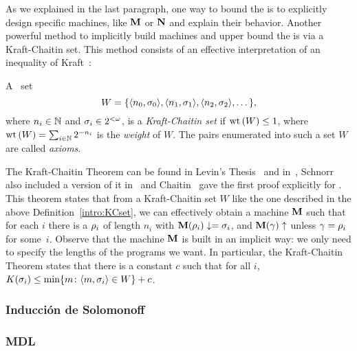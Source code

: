 As we explained in the last paragraph, one way to bound the
\kolcomp is to explicitly design specific machines, like ${\bf M}$ or
${\bf N}$ and explain their behavior. Another powerful method to
implicitly build \pfree machines and upper bound the \pfree
\kolcomp is via a Kraft-Chaitin set. This method consists of an
effective interpretation of an inequality of Kraft~\cite{K49}:

\begin{definicion}\label{intro:KCset}
 A \ce\ set
$$
W=\{\langle n_0 , \sigma_0 \rangle, \langle n_1 , \sigma_1 \rangle,
\langle n_2 , \sigma_2 \rangle,\dots\},
$$
where $n_i\in\mathbb{N}$ and $\sigma_i\in 2^{<\omega}$, is a {\em Kraft-Chaitin
set} if ${\rm wt}\left(W\right)\leq 1$, where ${\rm wt}\left(W\right)=
\sum_{i\in\mathbb{N}} 2^{-n_i}$ is the {\em weight} of $W$. The pairs
enumerated into such a set $W$ are called {\em axioms}.
\end{definicion}

The Kraft-Chaitin Theorem can be found in Levin's
Thesis~\cite{L71} and in~\cite{levin1974laws}, Schnorr also included a
version of it in~\cite{S73} and Chaitin~\cite{chaitin1975theory} gave the first
proof explicitly for \pfree \kolcomp. This theorem states that
from a Kraft-Chaitin set $W$ like the one described in the above
Definition~\ref{intro:KCset}, we can effectively obtain a \pfree
machine ${\bf M}$ such that for each $i$ there is a $\rho_i$ of length
$n_i$ with ${\bf M}(\rho_i)\downarrow=\sigma_i$, and ${\bf M}(\gamma)\uparrow$
unless $\gamma=\rho_i$ for some~$i$. Observe that the machine ${\bf M}$
is built in an implicit way: we only need to specify the lengths
of the programs we want. In particular, the Kraft-Chaitin Theorem
states that there is a constant $c$ such that for all $i$,
$K(\sigma_i)\leq\min\{m\colon\langle m , \sigma_i \rangle\in W\}+c$.

\bigskip


\subsubsection{Inducción de Solomonoff}

\subsubsection{MDL}

